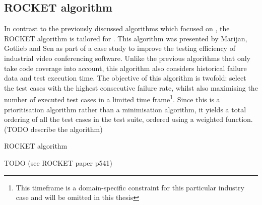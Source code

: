 
\subsection{ROCKET algorithm}
\label{ssec:alg-rocket}
In contrast to the previously discussed algorithms which focused on \tsm{}, the ROCKET algorithm is tailored for \tcp{}. This algorithm was presented by Marijan, Gotlieb and Sen \cite{6676952} as part of a case study to improve the testing efficiency of industrial video conferencing software. Unlike the previous algorithms that only take code coverage into account, this algorithm also considers historical failure data and test execution time. The objective of this algorithm is twofold: select the test cases with the highest consecutive failure rate, whilst also maximising the number of executed test cases in a limited time frame\footnote{This timeframe is a domain-specific constraint for this particular industry case and will be omitted in this thesis}. Since this is a prioritisation algorithm rather than a minimisation algorithm, it yields a total ordering of all the test cases in the test suite, ordered using a weighted function.\\

\noindent (TODO describe the algorithm)

\begin{algorithm}[h!]
\caption{ROCKET algorithm}
\label{alg:rocket}
\begin{algorithmic}[1]
	\State TODO (see ROCKET paper p541)
\end{algorithmic}
\end{algorithm}

